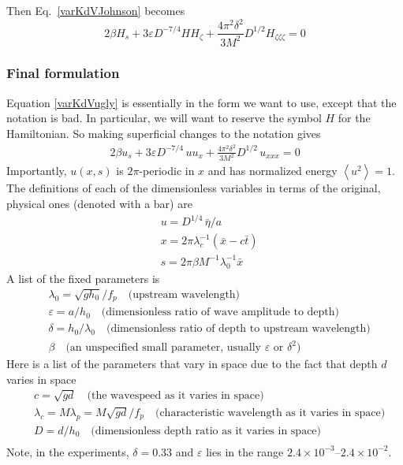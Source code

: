 \documentclass[12pt]{article}
\newcommand{\mean}[1]{\left< #1 \right>}
\newcommand{\eps}{\varepsilon}
\begin{document}
Then Eq.~\eqref{varKdVJohnson} becomes
\begin{equation}
\label{varKdVugly}
2 \beta H_s + 3 \eps D^{-7/4} H H_\zeta
+ \frac{4 \pi^2 \delta^2}{3 M^2} D^{1/2} H_{\zeta \zeta \zeta} = 0
\end{equation}

\subsubsection{Final formulation}
Equation \eqref{varKdVugly} is essentially in the form we want to use, except that the notation is bad. In particular, we will want to reserve the symbol $H$ for the Hamiltonian. So making superficial changes to the notation gives
\begin{align}
2 \beta u_s + 3 \eps D^{-7/4} \, u u_x
+ \frac{4 \pi^2 \delta^2}{3 M^2} D^{1/2} \, u_{xxx} = 0
\end{align}
Importantly, $u(x,s)$ is $2\pi$-periodic in $x$ and has normalized energy $\mean{u^2} = 1$.
The definitions of each of the dimensionless variables in terms of the original, physical ones (denoted with a bar) are
\begin{align}
& u = D^{1/4} \, \bar{\eta}/a \\
& x = 2\pi \lambda_c^{-1} (\bar{x} - c \bar{t})  \\
& s = 2 \pi \beta M^{-1} \lambda_0^{-1} \bar{x}
\end{align}
A list of the fixed parameters is
\begin{align}
& \lambda_0 = \sqrt{g h_0}/f_p \quad \text{(upstream wavelength)} \\
& \eps = a / h_0 \quad \text{(dimensionless ratio of wave amplitude to depth)} \\
& \delta = h_0 / \lambda_0 \quad \text{(dimensionless ratio of depth to upstream wavelength)} \\
& \beta	\quad \text{(an unspecified small parameter, usually $\eps$ or $\delta^2$)}
\end{align}
Here is a list of the parameters that vary in space due to the fact that depth $d$ varies in space
\begin{align}
& c = \sqrt{gd} \quad \text{(the wavespeed as it varies in space)} \\
&\lambda_c = M \lambda_p = M \sqrt{gd}/f_p \quad \text{(characteristic wavelength as it varies in space)} \\
&D = d/h_0 \quad \text{(dimensionless depth ratio as it varies in space)} \\	
\end{align}
Note, in the experiments, $\delta = 0.33$ and $\eps$ lies in the range $2.4 \times 10^{-3}$--$2.4 \times 10^{-2}$. 
\end{document}
